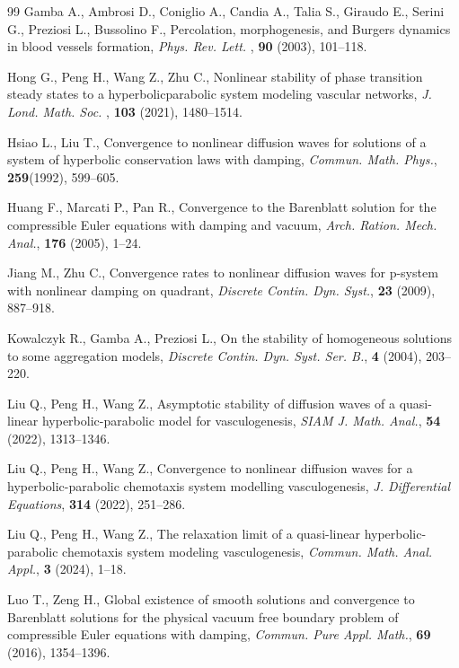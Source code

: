 \documentclass[11pt]{article}
\theoremstyle{plain}
\numberwithin{equation}{section}
\begin{document}
{\begin{thebibliography}{99}
			Gamba A., Ambrosi D., Coniglio A., Candia A., Talia S., Giraudo E., Serini G., Preziosi L.,  Bussolino F.,
			Percolation, morphogenesis, and Burgers dynamics in blood vessels formation, {\it Phys. Rev. Lett.} , {\bf 90 }(2003), 101--118.
			
			Hong G., Peng H., Wang Z., Zhu C.,  Nonlinear stability of phase transition steady states to a hyperbolicparabolic system modeling vascular networks, {\it J. Lond. Math. Soc.} , {\bf103} (2021), 1480--1514.
			
			Hsiao L., Liu T., Convergence to nonlinear diffusion waves for solutions of a system of hyperbolic conservation laws with damping, 
			{\it Commun. Math. Phys.}, {\bf259}(1992), 599--605.
			
			Huang F., Marcati P., Pan R., Convergence to the Barenblatt solution for the compressible
			Euler equations with damping and vacuum, {\it  Arch. Ration. Mech. Anal.}, {\bf 176} (2005), 1--24.
			
			
			Jiang M., Zhu C., Convergence rates to nonlinear diffusion waves for p-system with
			nonlinear damping on quadrant, {\it  Discrete Contin. Dyn. Syst.}, {\bf23} (2009), 887--918.
			
			
			Kowalczyk R., Gamba A., Preziosi L., On the stability of homogeneous solutions to some aggregation models, {\it Discrete Contin. Dyn. Syst. Ser. B.}, {\bf4} (2004), 203--220.
			
			Liu Q., Peng H., Wang Z., Asymptotic stability of diffusion waves of a quasi-linear hyperbolic-parabolic
			model for vasculogenesis, {\it SIAM J. Math. Anal.}, {\bf 54} (2022), 1313--1346.
			
			Liu Q., Peng H., Wang Z., Convergence to nonlinear diffusion waves for a hyperbolic-parabolic chemotaxis system modelling vasculogenesis, {\it J. Differential Equations}, {\bf314} (2022), 251--286.

	 Liu Q., Peng H., Wang Z., The relaxation limit of a quasi-linear hyperbolic-parabolic chemotaxis system modeling vasculogenesis, {\it Commun. Math. Anal. Appl.}, {\bf 3} (2024), 1--18.

Luo T., Zeng H.,  Global existence of smooth solutions and convergence to Barenblatt solutions for the physical vacuum free boundary problem of compressible Euler equations with damping, {\it Commun. Pure Appl. Math.}, {\bf 69} (2016), 1354--1396.



\end{thebibliography}}
\end{document}
